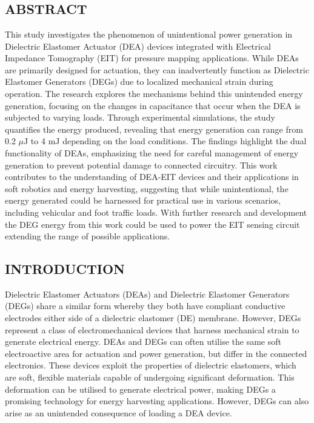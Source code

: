 \chapter{\chapviname}
\label{chapter6}
\section*{ABSTRACT}
	This study investigates the phenomenon of unintentional power generation in Dielectric Elastomer Actuator (DEA) devices integrated with Electrical Impedance Tomography (EIT) for pressure mapping applications. While DEAs are primarily designed for actuation, they can inadvertently function as Dielectric Elastomer Generators (DEGs) due to localized mechanical strain during operation. The research explores the mechanisms behind this unintended energy generation, focusing on the changes in capacitance that occur when the DEA is subjected to varying loads. Through experimental simulations, the study quantifies the energy produced, revealing that energy generation can range from 0.2 $\mu$J to 4 mJ depending on the load conditions. The findings highlight the dual functionality of DEAs, emphasizing the need for careful management of energy generation to prevent potential damage to connected circuitry. This work contributes to the understanding of DEA-EIT devices and their applications in soft robotics and energy harvesting, suggesting that while unintentional, the energy generated could be harnessed for practical use in various scenarios, including vehicular and foot traffic loads. With further research and development the DEG energy from this work could be used to power the EIT sensing circuit extending the range of possible applications.



\section{INTRODUCTION} %
\label{sec:introduction}
Dielectric Elastomer Actuators (DEAs) and Dielectric Elastomer Generators (DEGs) share a similar form whereby they both have compliant conductive electrodes either side of a dielectric elastomer (DE) membrane. However, DEGs represent a class of electromechanical devices that harness mechanical strain to generate electrical energy. DEAs and DEGs can often utilise the same soft electroactive area for actuation and power generation, but differ in the connected electronics. These devices exploit the properties of dielectric elastomers, which are soft, flexible materials capable of undergoing significant deformation. This deformation can be utilised to generate electrical power, making DEGs a promising technology for energy harvesting applications. However, DEGs can also arise as an unintended consequence of loading a DEA device.

